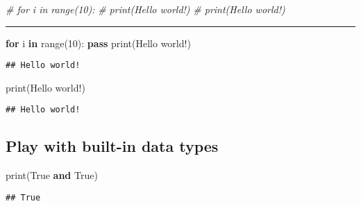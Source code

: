 \documentclass[
]{book}
\newenvironment{Shaded}{\begin{snugshade}}{\end{snugshade}}
\newcommand{\BuiltInTok}[1]{#1}
\newcommand{\CommentTok}[1]{\textcolor[rgb]{0.56,0.35,0.01}{\textit{#1}}}
\newcommand{\ControlFlowTok}[1]{\textcolor[rgb]{0.13,0.29,0.53}{\textbf{#1}}}
\newcommand{\DecValTok}[1]{\textcolor[rgb]{0.00,0.00,0.81}{#1}}
\newcommand{\KeywordTok}[1]{\textcolor[rgb]{0.13,0.29,0.53}{\textbf{#1}}}
\newcommand{\NormalTok}[1]{#1}
\newcommand{\StringTok}[1]{\textcolor[rgb]{0.31,0.60,0.02}{#1}}
\newcommand{\VariableTok}[1]{\textcolor[rgb]{0.00,0.00,0.00}{#1}}
\begin{document}
\begin{Shaded}
\begin{Highlighting}[]
\CommentTok{\# for i in range(10):}
\CommentTok{\# print(\textquotesingle{}Hello world!\textquotesingle{})}
\CommentTok{\# print(\textquotesingle{}Hello world!\textquotesingle{})}
\end{Highlighting}
\end{Shaded}

\begin{center}\rule{0.5\linewidth}{0.5pt}\end{center}

\begin{Shaded}
\begin{Highlighting}[]
\ControlFlowTok{for}\NormalTok{ i }\KeywordTok{in} \BuiltInTok{range}\NormalTok{(}\DecValTok{10}\NormalTok{):}
    \ControlFlowTok{pass}
\BuiltInTok{print}\NormalTok{(}\StringTok{\textquotesingle{}Hello world!\textquotesingle{}}\NormalTok{)}
\end{Highlighting}
\end{Shaded}

\begin{verbatim}
## Hello world!
\end{verbatim}

\begin{Shaded}
\begin{Highlighting}[]
\BuiltInTok{print}\NormalTok{(}\StringTok{\textquotesingle{}Hello world!\textquotesingle{}}\NormalTok{)}
\end{Highlighting}
\end{Shaded}

\begin{verbatim}
## Hello world!
\end{verbatim}

\hypertarget{play-with-built-in-data-types}{%
\subsection{Play with built-in data types}\label{play-with-built-in-data-types}}

\begin{Shaded}
\begin{Highlighting}[]
\BuiltInTok{print}\NormalTok{(}\VariableTok{True} \KeywordTok{and} \VariableTok{True}\NormalTok{)}
\end{Highlighting}
\end{Shaded}

\begin{verbatim}
## True
\end{verbatim}
\end{document}
